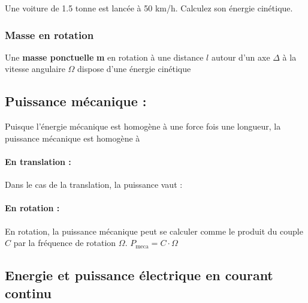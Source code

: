 \documentclass[10pt,fleqn]{article} %
\begin{document}
\begin{exemple}
    Une voiture de 1.5 tonne est lancée à 50 km/h. Calculez son énergie cinétique. 

\afaire {}

\correction{}
\end{exemple}


\subsubsection{Masse en rotation}
\begin{defi}
  Une \textbf{masse ponctuelle} \textbf{m} en rotation à une distance $l$ autour d'un axe $\Delta$ à la vitesse angulaire $\Omega$ dispose d'une énergie cinétique 
\end{defi}


\subsection{Puissance mécanique : }
Puisque l'énergie mécanique est homogène à une force fois une longueur, la puissance mécanique est homogène à 

\begin{defi}
  \paragraph{En translation : } Dans le cas de la translation, la puissance vaut : 
\paragraph{En rotation : }En rotation, la puissance mécanique peut se calculer comme le produit du couple $C$ par la fréquence de rotation $\Omega$. 
$P_{\text{meca}} = C \cdot \Omega$
\end{defi}


\subsection{Energie et puissance électrique en courant continu}
\end{document}
